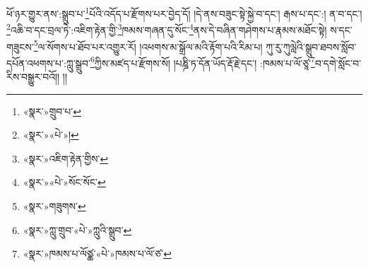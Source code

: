 ཕོ་ཉར་གྱུར་ནས་:སྒྲུབ་པ་\footnote{«སྣར་»གྲུབ་པ་}པོའི་འདོད་པ་རྫོགས་པར་བྱེད་དོ། །དེ་ནས་བཟུང་སྟེ་སྐྱེ་བ་དང་། རྒས་པ་དང་:། ན་བ་དང་། \footnote{«སྣར་»«པེ་»།  }འཆི་བ་དང་བྲལ་ཏེ་:འཇིག་རྟེན་གྱི་\footnote{«སྣར་»འཇིག་རྟེན་གྱིས་}ཁམས་གཞན་དུ་སོང་\footnote{«སྣར་»«པེ་»སོང་སོང་}ནས་དེ་བཞིན་གཤེགས་པ་རྣམས་མཐོང་སྟེ། ས་དང་གཟུངས་\footnote{«སྣར་»གཟུགས་}ལ་སོགས་པ་ཐོབ་པར་འགྱུར་རོ། །འཕགས་མ་སྒྲོལ་མའི་རྟོག་པའི་རིམ་པ། ཀུ་རུ་ཀུལླེའི་སྒྲུབ་ཐབས་སློབ་དཔོན་འཕགས་པ་:ཀླུ་སྒྲུབ་\footnote{«སྣར་»ཀླུ་གྲུབ་«པེ་»ཀླུའི་སྒྲུབ་}ཀྱིས་མཛད་པ་རྫོགས་སོ། །པཎྜི་ཏ་དོན་ཡོད་རྡོ་རྗེ་དང་། :ཁམས་པ་ལོ་ཙཱ་\footnote{«སྣར་»ཁམས་པ་ལོཙྪ་«པེ་»ཁམས་པ་ལོ་ཙ་}བ་དགེ་སློང་བ་རིས་བསྒྱུར་བའོ།། །།